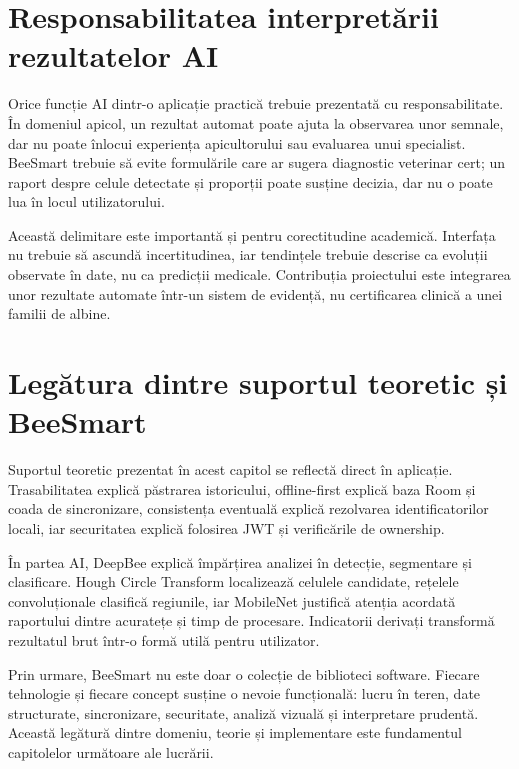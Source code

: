 \section{Responsabilitatea interpretării rezultatelor AI}

Orice funcție AI dintr-o aplicație practică trebuie prezentată cu responsabilitate. În domeniul apicol, un rezultat automat poate ajuta la observarea unor semnale, dar nu poate înlocui experiența apicultorului sau evaluarea unui specialist. BeeSmart trebuie să evite formulările care ar sugera diagnostic veterinar cert; un raport despre celule detectate și proporții poate susține decizia, dar nu o poate lua în locul utilizatorului.

Această delimitare este importantă și pentru corectitudine academică. Interfața nu trebuie să ascundă incertitudinea, iar tendințele trebuie descrise ca evoluții observate în date, nu ca predicții medicale. Contribuția proiectului este integrarea unor rezultate automate într-un sistem de evidență, nu certificarea clinică a unei familii de albine.

\section{Legătura dintre suportul teoretic și BeeSmart}

Suportul teoretic prezentat în acest capitol se reflectă direct în aplicație. Trasabilitatea explică păstrarea istoricului, offline-first explică baza Room și coada de sincronizare, consistența eventuală explică rezolvarea identificatorilor locali, iar securitatea explică folosirea JWT și verificările de ownership.

În partea AI, DeepBee explică împărțirea analizei în detecție, segmentare și clasificare. Hough Circle Transform localizează celulele candidate, rețelele convoluționale clasifică regiunile, iar MobileNet justifică atenția acordată raportului dintre acuratețe și timp de procesare. Indicatorii derivați transformă rezultatul brut într-o formă utilă pentru utilizator.

Prin urmare, BeeSmart nu este doar o colecție de biblioteci software. Fiecare tehnologie și fiecare concept susține o nevoie funcțională: lucru în teren, date structurate, sincronizare, securitate, analiză vizuală și interpretare prudentă. Această legătură dintre domeniu, teorie și implementare este fundamentul capitolelor următoare ale lucrării.
